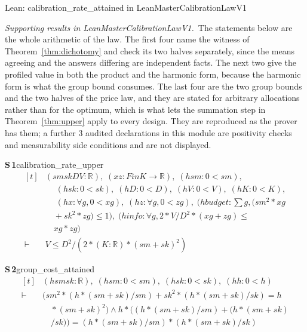 \documentclass[conference]{IEEEtran}
\theoremstyle{definition}
\newcommand{\lean}[1]{\textsf{\footnotesize #1}}
\newcommand{\leanbox}[1]{%
  \par\vspace{2pt}\noindent
  {\footnotesize\textsf{Lean: #1}}\par\vspace{2pt}}
\begin{document}
\leanbox{\lean{calibration\_rate\_attained} in \lean{LeanMasterCalibrationLawV1}}

\noindent\emph{Supporting results in \lean{LeanMasterCalibrationLawV1}.}~The statements below are the whole arithmetic of the law. The first four name the witness of Theorem~\ref{thm:dichotomy} and check its two halves separately, since the means agreeing and the answers differing are independent facts. The next two give the profiled value in both the product and the harmonic form, because the harmonic form is what the group bound consumes. The last four are the two group bounds and the two halves of the price law, and they are stated for arbitrary allocations rather than for the optimum, which is what lets the summation step in Theorem~\ref{thm:upper} apply to every design. They are reproduced as the prover has them; a further $3$ audited declarations in this module are positivity checks and measurability side conditions and are not displayed.

\noindent\textbf{S\,1}\quad\lean{calibration\_rate\_upper}
{\footnotesize\[ \begin{aligned}[t]
&(\mathit{sm} \mathit{sk} \mathit{D} \mathit{V} : \mathbb{R} ),\; (\mathit{x} \mathit{z} : \mathit{Fin} \mathit{K} \to \mathbb{R} ),\; (\mathit{hsm} : 0 < \mathit{sm}),\\
&\quad \; (\mathit{hsk} : 0 < \mathit{sk}),\; (\mathit{hD} : 0 < \mathit{D}),\; (\mathit{hV} : 0 < \mathit{V}),\; (\mathit{hK} : 0 < \mathit{K}),\\
&\quad \; (\mathit{hx} : \forall \mathit{g}, 0 < \mathit{x} \mathit{g}),\; (\mathit{hz} : \forall \mathit{g}, 0 < \mathit{z} \mathit{g}),\; (\mathit{hbudget} : \textstyle\sum \mathit{g}, (\mathit{sm} ^{2} * \mathit{x} \mathit{g}\\
&\quad + \mathit{sk} ^{2} * \mathit{z} \mathit{g}) \leq 1),\; (\mathit{hinfo} : \forall \mathit{g}, 2 * \mathit{V} / \mathit{D} ^{2} * (\mathit{x} \mathit{g} + \mathit{z} \mathit{g}) \leq\\
&\quad \mathit{x} \mathit{g} * \mathit{z} \mathit{g})\\
\vdash\;&\mathit{V} \leq \mathit{D} ^{2} / (2 * (\mathit{K} : \mathbb{R} ) * (\mathit{sm} + \mathit{sk}) ^{2})
\end{aligned} \]}

\noindent\textbf{S\,2}\quad\lean{group\_cost\_attained}
{\footnotesize\[ \begin{aligned}[t]
&(\mathit{h} \mathit{sm} \mathit{sk} : \mathbb{R} ),\; (\mathit{hsm} : 0 < \mathit{sm}),\; (\mathit{hsk} : 0 < \mathit{sk}),\; (\mathit{hh} : 0 < \mathit{h})\\
\vdash\;&(\mathit{sm} ^{2} * (\mathit{h} * (\mathit{sm} + \mathit{sk}) / \mathit{sm}) + \mathit{sk} ^{2} * (\mathit{h} * (\mathit{sm} + \mathit{sk}) / \mathit{sk}) = \mathit{h}\\
&\quad * (\mathit{sm} + \mathit{sk}) ^{2}) \wedge \mathit{h} * ((\mathit{h} * (\mathit{sm} + \mathit{sk}) / \mathit{sm}) + (\mathit{h} * (\mathit{sm} + \mathit{sk})\\
&\quad / \mathit{sk})) = (\mathit{h} * (\mathit{sm} + \mathit{sk}) / \mathit{sm}) * (\mathit{h} * (\mathit{sm} + \mathit{sk}) / \mathit{sk})
\end{aligned} \]}
\end{document}
